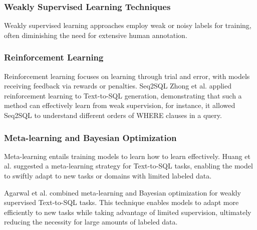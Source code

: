 \subsubsection{Weakly Supervised Learning Techniques}

Weakly supervised learning approaches employ weak or noisy labels for training, often diminishing the need for extensive human annotation.

\subsubsection*{Reinforcement Learning}

Reinforcement learning focuses on learning through trial and error, with models receiving feedback via rewards or penalties. Seq2SQL Zhong et al. \cite{zhong_seq2sql_2017} applied reinforcement learning to Text-to-SQL generation, demonstrating that such a method can effectively learn from weak supervision, for instance, it allowed Seq2SQL to understand different orders of WHERE clauses in a query.

\subsubsection*{Meta-learning and Bayesian Optimization}

Meta-learning entails training models to learn how to learn effectively. Huang et al. \cite{huang-etal-2018-natural} suggested a meta-learning strategy for Text-to-SQL tasks, enabling the model to swiftly adapt to new tasks or domains with limited labeled data.

Agarwal et al. \cite{pmlr-v97-agarwal19e} combined meta-learning and Bayesian optimization for weakly supervised Text-to-SQL tasks. This technique enables models to adapt more efficiently to new tasks while taking advantage of limited supervision, ultimately reducing the necessity for large amounts of labeled data.